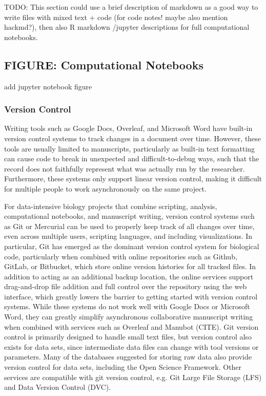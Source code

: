 \documentclass[10pt,letterpaper]{article}
\begin{document}
TODO: This section could use a brief description of markdown as a good way to write files with mixed text + code (for code notes! maybe also mention hackmd?), then also R markdown /jupyter descriptions for full computational notebooks. 

 
\begin{greybox}{\subsection*{FIGURE: Computational Notebooks}
add jupyter notebook figure
}
\end{greybox}

\subsubsection*{Version Control} 

Writing tools such as Google Docs, Overleaf, and Microsoft Word have built-in version control systems to track changes in a document over time. 
However, these tools are usually limited to manuscripts, particularly as built-in text formatting can cause code to break in unexpected and difficult-to-debug ways, such that the record does not faithfully represent what was actually run by the researcher. 
Furthermore, these systems only support linear version control, making it difficult for multiple people to work asynchronously on the same project. 

For data-intensive biology projects that combine scripting, analysis, computational notebooks, and manuscript writing, version control systems such as Git or Mercurial can be used to properly keep track of all changes over time, even across multiple users, scripting languages, and including visualizations. 
In particular, Git has emerged as the dominant version control system for biological code, particularly when combined with online repositories such as Github, GitLab, or Bitbucket, which store online version histories for all tracked files.
In addition to acting as an additional backup location, the online services support drag-and-drop file addition and full control over the repository using the web interface, which greatly lowers the barrier to getting started with version control systems. 
While these systems do not work well with Google Docs or Microsoft Word, they can greatly simplify asynchronous collaborative manuscript writing when combined with services such as Overleaf and Manubot (CITE). 
Git version control is primarily designed to handle small text files, but version control also exists for data sets, since intermediate data files can change with tool versions or parameters. 
Many of the databases suggested for storing raw data also provide version control for data sets, including the Open Science Framework. 
Other services are compatible with git version control, e.g. Git Large File Storage (LFS) and Data Version Control (DVC).
\end{document}
